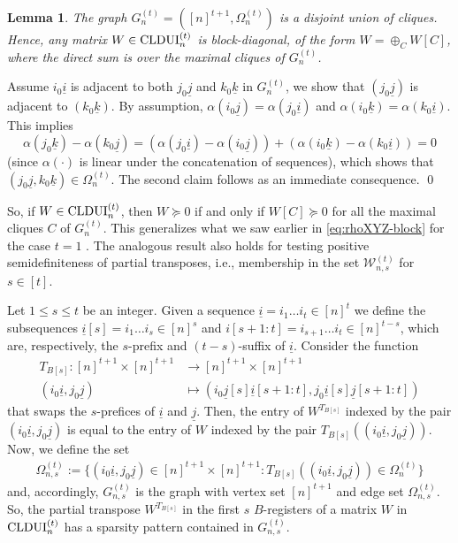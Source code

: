 \documentclass[11pt]{article}
\makeatletter
\newcommand{\MW}{{\mathcal W}}
\newcommand{\CLDUI}{\text{\rm CLDUI}}
\newcommand{\ui}{\underline{i}}
\newcommand{\uj}{\underline{j}}
\newcommand{\uk}{\underline{k}}
\theoremstyle{plain}
\newtheorem{lemma}[satz]{Lemma}
\newtheorem{corollary}[satz]{Corollary}
\renewenvironment{proof}[1][\proofname]{%
  \par
  \pushQED{}%
  \normalfont
  \topsep6\p@\@plus6\p@
  \trivlist
  \item[\hskip\labelsep\itshape #1\@addpunct{.}]%
}{%
  \popQED
  \endtrivlist
}
\makeatother
\begin{document}
\begin{lemma}\label{lem:Cliques-s=0}
    The graph $G^{(t)}_n=([n]^{t+1}, \Omega^{(t)}_n)$ is a disjoint union of cliques. Hence, any matrix $W\in\CLDUI^{(t)}_n$ is block-diagonal, of the form $W=\oplus_C W[C]$, where the direct sum is over the maximal cliques of $G^{(t)}_n$. 
\end{lemma}
\begin{proof}
    Assume $i_0\ui$ is adjacent to both  $j_0\uj$ and $k_0\underline k$ in $G^{(t)}_n$, we show that $(j_0\uj)$ is adjacent to $(k_0\uk)$. By assumption,  $\alpha(i_0\uj)=\alpha(j_0\ui)$ and $\alpha(i_0\uk)=\alpha(k_0\ui)$. This implies
     $$\alpha(j_0\uk)-\alpha(k_0\uj)= (\alpha(j_0\ui)-\alpha(i_0\uj))+ (\alpha(i_0\uk)-\alpha(k_0\ui))=0$$%
(since $\alpha(\cdot)$ is linear under the concatenation of sequences), 
which shows that $(j_0\uj,k_0\uk)\in\Omega^{(t)}_n$. %
The second claim follows as an immediate consequence.
\qed\end{proof}

So, if $W\in\CLDUI^{(t)}_n$, then 
   $W\succeq 0$ if and only if $W[C]\succeq 0$ for all the maximal cliques $C$ of $G^{(t)}_n$. 
This generalizes what we  saw earlier in   \eqref{eq:rhoXYZ-block} for the case $t=1$ .
The analogous result also holds  for testing positive semidefiniteness of partial transposes, i.e., membership in the set $\MW^{(t)}_{n,s}$ for $s\in [t]$.

\medskip
Let $1\leq s\leq t$ be an integer. Given a sequence $\ui=i_1\ldots i_t\in[n]^t$ we define the subsequences  $\ui[s]=i_1\ldots i_s\in[n]^s$  and $i[s+1:t]=i_{s+1}\ldots i_t\in[n]^{t-s}$, which are, respectively, the $s$-prefix and  $(t-s)$-suffix of $\ui$. Consider the function
\begin{align*}
    T_{B[s]}:[n]^{t+1}\times[n]^{t+1}&\to[n]^{t+1}\times[n]^{t+1}\\
    (i_0\ui, j_0\uj)&\mapsto(i_0\uj[s]\ui[s+1:t],j_0\ui[s]\uj[s+1:t])
\end{align*}
that swaps the $s$-prefices of $\ui$ and $\uj$. Then, the entry of $W^{T_{B[s]}}$ indexed by the pair $(i_0\ui,j_0\uj)$ is equal to the entry of $W$ indexed by the pair $T_{B[s]}((i_0\ui,j_0\uj))$. Now, we  define  the set
\begin{align*}
    \Omega^{(t)}_{n,s}:=\{(i_0\ui, j_0\uj)\in[n]^{t+1}\times[n]^{t+1}:T_{B[s]}((i_0\ui, j_0\uj))\in\Omega^{(t)}_{n}\}
\end{align*}
and, accordingly, $G_{n,s}^{(t)}$ is the graph with vertex set $[n]^{t+1}$ and edge set $\Omega^{(t)}_{n,s}$. So, the partial transpose $W^{T_{B[s]}}$  in the first $s$ $B$-registers of a matrix $W$ in $\CLDUI^{(t)}_n$ has a sparsity pattern contained in $G_{n,s}^{(t)}$.
\end{document}
